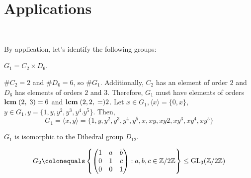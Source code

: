 \section{Applications}~\label{sec:applications}

By application, let's identify the following groups:
\begin{enumalph}
  \item $G_1 = C_2 \times D_6$. \\
  \begin{Answer}
    $\#C_2 = 2$ and $\#D_6 = 6$, so $\#G_1$.
    Additionally, $C_2$ has an element of order $2$ and $D_6$ has elements of
    orders $2$ and $3$. Therefore, $G_1$ must have elements of orders
    $\mathbf{lcm}\;(2,\;3) = 6$ and $\mathbf{lcm}\;(2, 2,\;=) 2$.
    Let $x \in G_1, \langle x \rangle = \{0, x\}$,
    $y \in G_1, y = \{1, y, y^2, y^3, y^4. y^5 \}$.
    Then, \[
      G_1 = \langle x, y \rangle
      = \{1, y, y^2, y^3, y^4, y^5, x, xy, xy2, xy^3, xy^4, xy^5\}
    \]
    
    $G_1$ is isomorphic to the Dihedral group $D_{12}$.
  \end{Answer}  

  \item \[ G_2 \colonequals
    \left\{ \begin{pmatrix}
      1 & a & b \\
      0 & 1 & c \\
      0 & 0 & 1
    \end{pmatrix} : a,b,c \in \Z/2\Z \right\} \leq \GL_3(\Z/2\Z) \]


\end{enumalph}
